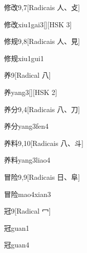 \begin{entry}{修改}{9,7}[Radicais ⼈、⽁]
  \begin{phonetics}{修改}{xiu1gai3}[][HSK 3]
  \end{phonetics}
\end{entry}

\begin{entry}{修规}{9,8}[Radicais ⼈、⾒]
  \begin{phonetics}{修规}{xiu1gui1}
  \end{phonetics}
\end{entry}

\begin{entry}{养}{9}[Radical ⼋]
  \begin{phonetics}{养}{yang3}[][HSK 2]
  \end{phonetics}
\end{entry}

\begin{entry}{养分}{9,4}[Radicais ⼋、⼑]
  \begin{phonetics}{养分}{yang3fen4}
  \end{phonetics}
\end{entry}

\begin{entry}{养料}{9,10}[Radicais ⼋、⽃]
  \begin{phonetics}{养料}{yang3liao4}
  \end{phonetics}
\end{entry}

\begin{entry}{冒险}{9,9}[Radicais ⽇、⾩]
  \begin{phonetics}{冒险}{mao4xian3}
  \end{phonetics}
\end{entry}

\begin{entry}{冠}{9}[Radical ⼍]
  \begin{phonetics}{冠}{guan1}
  \end{phonetics}
  \begin{phonetics}{冠}{guan4}
  \end{phonetics}
\end{entry}

